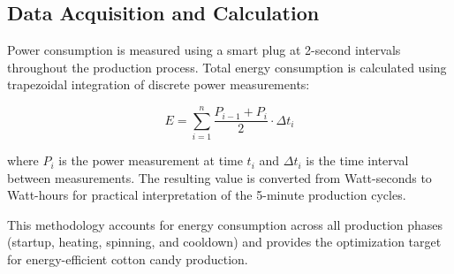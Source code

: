 \subsection{Data Acquisition and Calculation}

Power consumption is measured using a smart plug at 2-second intervals throughout the production process. Total energy consumption is calculated using trapezoidal integration of discrete power measurements:

\[
E = \sum_{i=1}^{n} \frac{P_{i-1} + P_i}{2} \cdot \Delta t_i
\]

where $P_i$ is the power measurement at time $t_i$ and $\Delta t_i$ is the time interval between measurements. The resulting value is converted from Watt-seconds to Watt-hours for practical interpretation of the 5-minute production cycles.

This methodology accounts for energy consumption across all production phases (startup, heating, spinning, and cooldown) and provides the optimization target for energy-efficient cotton candy production.

